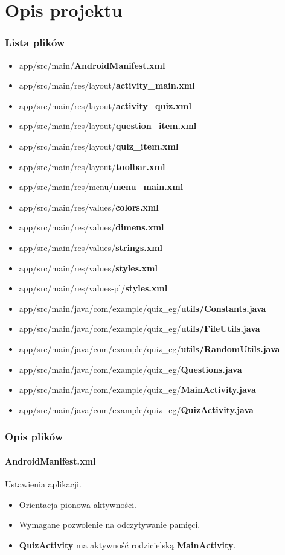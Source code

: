 \documentclass[12pt, a4paper]{article}
\begin{document}
\part{Opis projektu}
\section{Lista plików}
\begin{itemize}
\item app/src/main/\textbf{AndroidManifest.xml}
\item app/src/main/res/layout/\textbf{activity\_main.xml}
\item app/src/main/res/layout/\textbf{activity\_quiz.xml}
\item app/src/main/res/layout/\textbf{question\_item.xml}
\item app/src/main/res/layout/\textbf{quiz\_item.xml}
\item app/src/main/res/layout/\textbf{toolbar.xml}
\item app/src/main/res/menu/\textbf{menu\_main.xml}
\item app/src/main/res/values/\textbf{colors.xml}
\item app/src/main/res/values/\textbf{dimens.xml}
\item app/src/main/res/values/\textbf{strings.xml}
\item app/src/main/res/values/\textbf{styles.xml}
\item app/src/main/res/values-pl/\textbf{styles.xml}
\item app/src/main/java/com/example/quiz\_eg/\textbf{utils/Constants.java}
\item app/src/main/java/com/example/quiz\_eg/\textbf{utils/FileUtils.java}
\item app/src/main/java/com/example/quiz\_eg/\textbf{utils/RandomUtils.java}
\item app/src/main/java/com/example/quiz\_eg/\textbf{Questions.java}
\item app/src/main/java/com/example/quiz\_eg/\textbf{MainActivity.java}
\item app/src/main/java/com/example/quiz\_eg/\textbf{QuizActivity.java}
\end{itemize}
\newpage

\section{Opis plików}

\subsection{AndroidManifest.xml}
Ustawienia aplikacji.\\
\begin{itemize}
\item Orientacja pionowa aktywności.
\item Wymagane pozwolenie na odczytywanie pamięci.
\item \textbf{QuizActivity} ma aktywność rodzicielską \textbf{MainActivity}.
\end{itemize}
\end{document}
